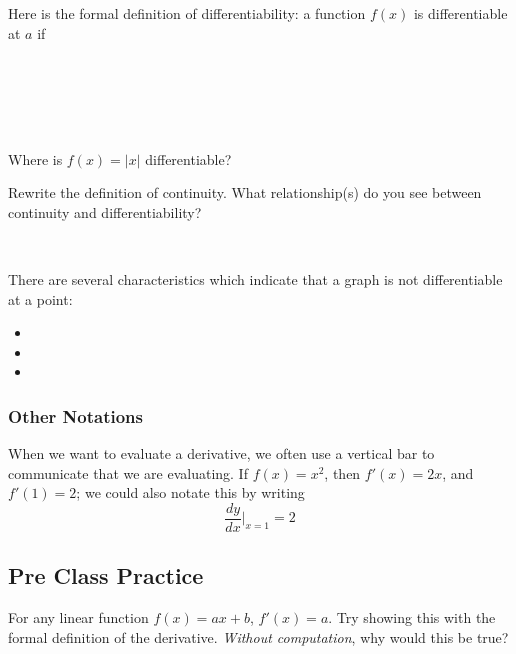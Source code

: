 \documentclass[notes]{subfiles}
\begin{document}
		\begin{rmk}[A Note]
			Here is the formal definition of differentiability: a function $f(x)$ is differentiable at $a$ if 


				\\ \\ \\ \\
			
		\end{rmk}
			\newpage
			
		\begin{ex}
			Where is \(f(x) = |x|\) differentiable?
		\end{ex}

		\begin{question}
			Rewrite the definition of continuity.  What relationship(s) do you see between continuity and differentiability?
		\end{question}
			
		\begin{rmk}
				\\[30pt]
		\end{rmk}
			\newpage
			
		There are several characteristics which indicate that a graph is not differentiable at a point:

			\begin{itemize}
			\setlength\itemsep{25pt}
				\item 
				\item
				\item
			\end{itemize}
		
	\subsubsection*{Other Notations}
		\begin{rmk}
				\vspace*{1.5in}
			
		\end{rmk}
		
		When we want to evaluate a derivative, we often use a vertical bar to communicate that we are evaluating.  If \(f(x) = x^2\), then \(f'(x) = 2x\), and \(f'(1) = 2\); we could also notate this by writing
		\[\dfrac{dy}{dx}\bigg\rvert_{x = 1} = 2\]	
			 \newpage
	\subsection*{Pre Class Practice}
		\begin{ex}
			For any linear function \(f(x) = ax + b\), \(f'(x) = a\).  Try showing this with the formal definition of the derivative.  \emph{Without computation}, why would this be true?
		\end{ex}
			
\end{document}
